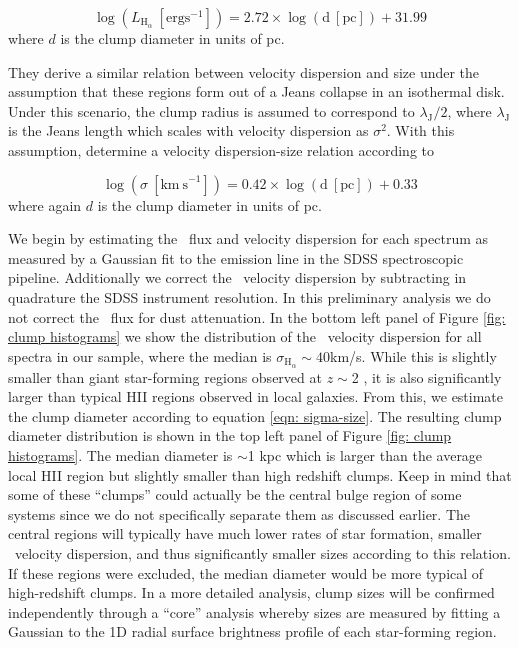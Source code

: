 \begin{equation}\label{eqn: luminsotiy-size}
\log(L_{\mathrm{H}_{\alpha}}\ [\mathrm{erg s}^{-1}]) = 2.72\times\log(\mathrm{d\ [pc]})+31.99
\end{equation}
where $d$ is the clump diameter in units of pc. 

They derive a similar relation between velocity dispersion and size under the assumption that these regions form out of a Jeans collapse in an isothermal disk. Under this scenario, the clump radius is assumed to correspond to $\lambda_{\mathrm{J}}/2$, where $\lambda_{\mathrm{J}}$ is the Jeans length which scales with velocity dispersion as $\sigma^2$. With this assumption, \cite{Wisnioski2012} determine a velocity dispersion-size relation according to

\begin{equation}\label{eqn: sigma-size}
\log(\sigma\ [\mathrm{km\ s}^{-1}]) = 0.42\times\log(\mathrm{d\ [pc]})+0.33
\end{equation}
where again $d$ is the clump diameter in units of pc.

We begin by estimating the \ha~flux and velocity dispersion for each spectrum as measured by a Gaussian fit to the emission line in the SDSS spectroscopic pipeline. Additionally we correct the \ha~velocity dispersion by subtracting in quadrature the SDSS instrument resolution. In this preliminary analysis we do not correct the \ha~flux for dust attenuation. In the bottom left panel of Figure \ref{fig: clump histograms} we show the distribution of the \ha~velocity dispersion for all spectra in our sample, where the median is $\sigma_{\mathrm{H}_{\alpha}}\sim40$km/s. While this is slightly smaller than giant star-forming regions observed at $z\sim$2 \citep{Elmegreen2010,Sanchez2013}, it is also significantly larger than typical HII regions observed in local galaxies. From this, we estimate the clump diameter according to equation \ref{eqn: sigma-size}. The resulting clump diameter distribution is shown in the top left panel of Figure \ref{fig: clump histograms}. The median diameter is $\sim$1 kpc which is larger than the average local HII region but slightly smaller than high redshift clumps.  Keep in mind that some of these ``clumps'' could actually be the central bulge region of some systems since we do not specifically separate them as discussed earlier. The central regions will typically have much lower rates of star formation, smaller \ha~velocity dispersion, and thus significantly smaller sizes according to this relation. If these regions were excluded, the median diameter would be more typical of high-redshift clumps. In a more detailed analysis, clump sizes will be confirmed independently through a ``core'' analysis whereby sizes are measured by fitting a Gaussian to the 1D radial surface brightness profile of each star-forming region.  

